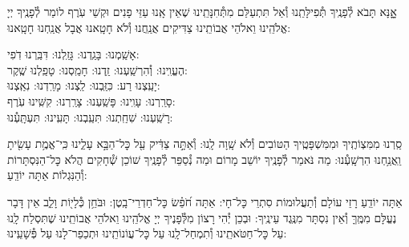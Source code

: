 \documentclass[twoside, openany, parskip=half, 11pt]{book}
\begin{document}
אׇׇׇנָּא תָּבֹא לְ֯פָנֶֽיךָ תְּ֯פִילָּתֵֽנוּ וְ֯אַל תִּתְעַלַּם מִתְּ֯חִנָּתֵֽינוּ שֶׁאֵין אָֽנוּ עַזֵּי פָנִים וּקְשֵׁי עֹֽרֶף לוֹמַר לְ֯פָנֶֽיךָ יְיָ אֱלֹהֵֽינוּ וֵאלֹהֵי אֲבוֹתֵֽינוּ צַדִּיקִים אֲנַֽחֲנוּ וְ֯לֹא חָטָֽאנוּ אֲבָל אֲנַֽחְנוּ חָטָֽאנוּ:

אָשַֽׁמְנוּ: בָּגַֽדְנוּ: גָּזַֽלְנוּ: דִּבַּֽרְנוּ דֹֽפִי: \\
הֶעֱוִֽינוּ: וְ֯הִרְשַֽׁעְנוּ: זַֽדְנוּ: חָמַֽסְנוּ: טָפַֽלְנוּ שֶֽׁקֶר:\\
יָעַֽצְנוּ רַע: כִּזַּֽבְנוּ: לַֽצְנוּ: מָרַֽדְנוּ: נִאַֽצְנוּ: \\
סָרַֽרְנוּ: עָוִֽינוּ: פָּשַֽׁעְנוּ: צָרַֽרְנוּ: קִשִּֽׁינוּ עֹֽרֶף:\\
רָשַֽׁעְנוּ: שִׁחַֽתְנוּ: תִּעַֽבְנוּ: תָּעִֽינוּ: תִּעְתָּֽעְ֯נוּ:

סַֽרְנוּ מִמִּצְוֹתֶֽיךָ וּמִמִּשְׁפָּטֶֽיךָ הַטּוֹבִים וְ֯לֹא שָֽׁוָה לָֽנוּ: וְ֯אַתָּ֣ה צַדִּ֔יק עַ֖ל כׇּל־הַבָּ֣א עָלֵ֑ינוּ כִּֽי־אֱמֶ֥ת עָשִׂ֖יתָ וַֽאֲנַ֥חְנוּ הִרְשָֽׁעְ֯נוּ: מַה נֹּאמַר לְ֯פָנֶֽיךָ יוֹשֵׁב מָרוֹם וּמַה נְ֯סַפֵּר לְ֯פָנֶֽיךָ שׁוֹכֵן שְׁ֯חָקִים הֲלֹא כׇּל־הַנִּסְתָּרוֹת וְ֯הַנִּגְלוֹת אַתָּה יוֹדֵֽעַ:

אַתָּה יוֹדֵֽעַ רָזֵי עוֹלָם וְ֯תַעֲלוּמוֹת סִתְרֵי כׇּל־חָי: אַתָּה חֹ֝פֵ֗שׂ כׇּל־חַדְרֵי־בָֽטֶן: וּבֹּחֵ֥ן כְּ֯לָי֖וֹת וָלֵ֑ב אֵין דָּבָר נֶעֱלָּם מִמֶּֽךָּ וְ֯אֵין נִסְתָּר מִנֶּֽגֶד עֵינֶֽיךָ: וּבְכֵן יְ֯הִי רָצוֹן מִלְּ֯פָנֶיךָ יְיָ אֱלֹהֵֽינוּ וֵאלֹהֵי אֲבוֹתֵֽינוּ שֶׁתִּסְלַח לָֽנוּ עַל כׇּל־חַטֹּאתֵֽינוּ וְ֯תִמְחַל־לָֽנוּ עַל כׇּל־עֲוֹנוֹתֵֽינוּ וּתְכַפֵר־לָנוּ עַל פְּ֯שָׁעֵֽינוּ:
\end{document}
